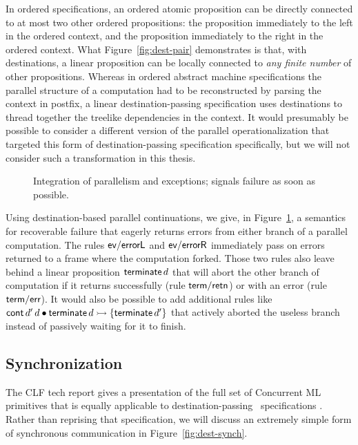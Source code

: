 In ordered specifications, an ordered atomic proposition can be
directly connected to at most two other ordered propositions: the
proposition immediately to the left in the ordered context, and the
proposition immediately to the right in the ordered context. What
Figure~\ref{fig:dest-pair} demonstrates is that, with destinations, a
linear proposition can be locally connected to {\it any finite number}
of other propositions. Whereas in ordered abstract machine
specifications the parallel structure of a computation had to be
reconstructed by parsing the context in postfix, a linear
destination-passing specification uses destinations to thread together
the treelike dependencies in the context. It would presumably be
possible to consider a different version of the parallel
operationalization that targeted this form of destination-passing
specification specifically, but we will not consider such a
transformation in this thesis. 

\begin{figure}
\caption{Integration of parallelism and exceptions; signals failure as
  soon as possible.}
\label{fig:dest-fail-paror}
\end{figure}

Using destination-based parallel continuations, we give, in
Figure~\ref{fig:dest-fail-paror}, a semantics for recoverable failure
that eagerly returns errors from either branch of a parallel
computation. The rules ${\sf ev/errorL}$ and ${\sf ev/errorR}$
immediately pass on errors returned to a frame where the computation
forked.  Those two rules also leave behind a linear proposition ${\sf
  terminate}\,d$ that will abort the other branch of computation if it
returns successfully (rule ${\sf term/retn}$) or with an error (rule
${\sf term/err}$). It would also be possible to add additional rules
like ${\sf cont}\,d'\,d \mathbin{\bullet} {\sf terminate}\,d \rightarrowtail \{ {\sf
  terminate}\,d' \}$ that actively aborted the useless branch instead
of passively waiting for it to finish.

\subsection{Synchronization}
\label{sec:dest-synch}

The CLF tech report gives a presentation of the full set of Concurrent
ML primitives that is equally applicable to destination-passing
\sls~specifications \cite{cervesato02concurrent}. Rather than
reprising that specification, we will discuss an extremely simple form
of synchronous communication in Figure~\ref{fig:dest-synch}. 

